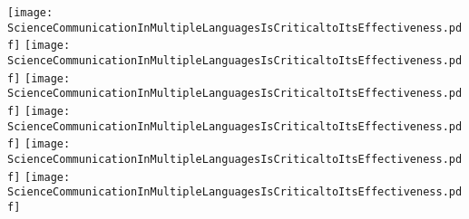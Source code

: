 \documentclass[main.tex]{subfiles}
\begin{document}
\setcounter{subsection}{18}
\label{task:2024-04-24-2}
{\parindent10pt\texttt{[image: ScienceCommunicationInMultipleLanguagesIsCriticaltoItsEffectiveness.pdf]}}\newpage
{\parindent10pt\texttt{[image: ScienceCommunicationInMultipleLanguagesIsCriticaltoItsEffectiveness.pdf]}}\newpage
{\parindent10pt\texttt{[image: ScienceCommunicationInMultipleLanguagesIsCriticaltoItsEffectiveness.pdf]}}\newpage
{\parindent10pt\texttt{[image: ScienceCommunicationInMultipleLanguagesIsCriticaltoItsEffectiveness.pdf]}}\newpage
{\parindent10pt\texttt{[image: ScienceCommunicationInMultipleLanguagesIsCriticaltoItsEffectiveness.pdf]}}\newpage
{\parindent10pt\texttt{[image: ScienceCommunicationInMultipleLanguagesIsCriticaltoItsEffectiveness.pdf]}}
\end{document}
